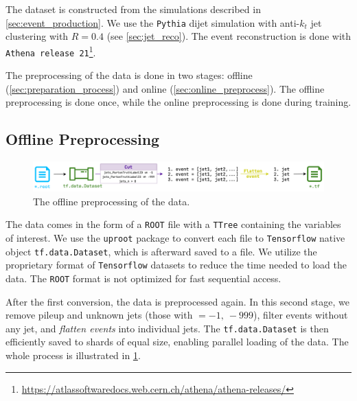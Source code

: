 The dataset is constructed from the \MC simulations described in \cref{sec:event_production}.
We use the \texttt{Pythia} dijet \MC simulation with anti-$k_t$ jet clustering with $R = 0.4$ (see \cref{sec:jet_reco}). 
The event reconstruction is done with \texttt{Athena release 21}\footnote{\url{https://atlassoftwaredocs.web.cern.ch/athena/athena-releases/}}.

The preprocessing of the data is done in two stages: offline (\cref{sec:preparation_process}) and online (\cref{sec:online_preprocess}).
The offline preprocessing is done once, while the online preprocessing is done during training.

\subsection{Offline Preprocessing}
\begin{figure}[!ht]
    \centering
    \includegraphics[width=1.\textwidth]{src/diagrams/data_prep_off.png}
    \caption{The offline preprocessing of the data.}
    \label{fig:data_prep_off}
\end{figure}
\label{sec:preparation_process}
The data comes in the form of a \texttt{ROOT} \cite{root} file with a \texttt{TTree} containing the variables of interest.
We use the \texttt{uproot} \cite{uproot} package to convert each file to \texttt{Tensorflow} \cite{tf} native object \texttt{tf.data.Dataset}\footnotemark, which is afterward saved to a file.
We utilize the proprietary format of \texttt{Tensorflow} datasets to reduce the time needed to load the data.
The \texttt{ROOT} format is not optimized for fast sequential access. 

After the first conversion, the data is preprocessed again.
In this second stage, we remove pileup and unknown jets (those with \PID $= -1,\ -999$), filter events without any jet, and \emph{flatten events} into individual jets.
The \texttt{tf.data.Dataset} is then efficiently saved to shards of equal size, enabling parallel loading of the data.
The whole process is illustrated in \cref{fig:data_prep_off}.


